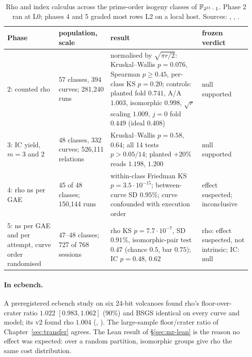 \begin{table}[t]
\centering\footnotesize
\begin{tabularx}{\linewidth}{@{}>{\raggedright}p{1.9cm}>{\raggedright}p{2.3cm}>{\raggedright}X>{\raggedright\arraybackslash}p{2.1cm}@{}}
\toprule
Phase & population, scale & result & frozen verdict \\
\midrule
2: counted rho & 57 classes, 394 curves; 281{,}240 runs & normalised by $\sqrt{\pi r/2}$: Kruskal--Wallis $p=0.076$, Spearman $p\ge0.45$, per-class KS $p=0.20$; controls: planted fold $0.741$, A/A $1.003$, isomorphic $0.998$, $\sqrt r$ scaling $1.009$, $j=0$ fold $0.449$ (ideal $0.408$) & null supported \\
3: IC yield, $m=3$ and 2 & 48 classes, 332 curves; 526{,}111 relations & Kruskal--Wallis $p=0.58$, $0.64$; all 14 tests $p>0.05/14$; planted $+20\%$ reads $1.198$, $1.200$ & null supported \\
4: rho ns per GAE & 45 of 48 classes; 150{,}144 runs & within-class Friedman KS $p=3.5\cdot10^{-15}$; between-curve SD $0.95\%$; curve confounded with execution order & effect suspected; inconclusive \\
5: ns per GAE and per attempt, curve order randomised & 47--48 classes; 727 of 768 sessions & rho KS $p=7.7\cdot10^{-7}$, SD $0.91\%$, isomorphic-pair test $0.47$ (chance $0.5$, bar $0.75$); IC $p=0.48$, $0.62$ & rho: effect suspected, not intrinsic; IC: null \\
\bottomrule
\end{tabularx}
\caption[]{Rho and index calculus across the prime-order isogeny classes
of $\mathbb{F}_{2^{31}-1}$. Phase 2 ran at L0; phases 4 and 5 graded most rows L2
on a local host. Sources:
,
,
.}
\label{tab:rv-fp31}
\end{table}

\paragraph{In ecbench.} A preregistered ecbench study on six 24-bit
volcanoes found rho's floor-over-crater ratio $1.022$ $[0.983,1.062]$ (90\%)
and BSGS identical on every curve and model; its v2 found rho $1.004$
(,
). The large-sample
floor/crater ratio of Chapter~\ref{sec:transfer} agrees. The Lean result of
\S\ref{sec:mr-lean} is the reason no effect was expected: over a random
partition, isomorphic groups give rho the same cost distribution.

